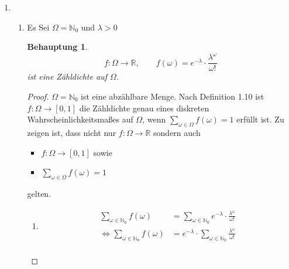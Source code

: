 \documentclass[a4paper]{scrartcl}
\newtheorem*{behaupt}{Behauptung}
\newcommand{\gdw}{\Leftrightarrow}
\begin{document}
\begin{enumerate}[label=\bfseries\arabic*.]
    \item
        \begin{enumerate}[label=(\alph*)]
            \item
                Es Sei $\Omega = \mathbb{N}_0$ und $\lambda > 0$
                \begin{behaupt}
                    \begin{equation*}
                        f\colon \Omega \to \mathbb{R}, \qquad
                        f(\omega)
                        = e^{-\lambda} \cdot \frac{\lambda^\omega}{\omega!}
                    \end{equation*}
                    ist eine Zähldichte auf $\Omega$.
                \end{behaupt}
                \begin{proof}
                    $\Omega = \mathbb{N}_0$ ist eine abzählbare Menge.
                    Nach Definition 1.10 ist $f\colon \Omega \to [0,1]$ die
                    Zähldichte genau eines diskreten Wahrscheinlichkeitsmaßes
                    auf $\Omega$, wenn
                    $\sum\limits_{\omega \in \Omega} f(\omega) = 1$ erfüllt ist.
                    Zu zeigen ist, dass nicht nur
                    $f\colon \Omega \to \mathbb{R}$ sondern auch
                    \begin{itemize}
                        \item $f\colon \Omega \to [0,1]$ sowie
                        \item $\sum\limits_{\omega \in \Omega} f(\omega) = 1$
                    \end{itemize}
                    gelten.
                    \begin{enumerate}
                        \item
                            \begin{equation*}
                                \begin{split}
                                    \sum_{\omega \in \mathbb{N}_0} f(\omega)
                                    &= \sum_{\omega \in \mathbb{N}_0}
                                        e^{-\lambda} \cdot
                                        \frac{\lambda^\omega}{\omega!} \\
                                    \gdw
                                    \sum_{\omega \in \mathbb{N}_0} f(\omega)
                                    &= e^{-\lambda}
                                        \cdot \sum_{\omega \in \mathbb{N}_0}
                                        \frac{\lambda^\omega}{\omega!} \\

\end{split}
\end{equation*}
\end{enumerate}
\end{proof}
\end{enumerate}
\end{enumerate}
\end{document}
